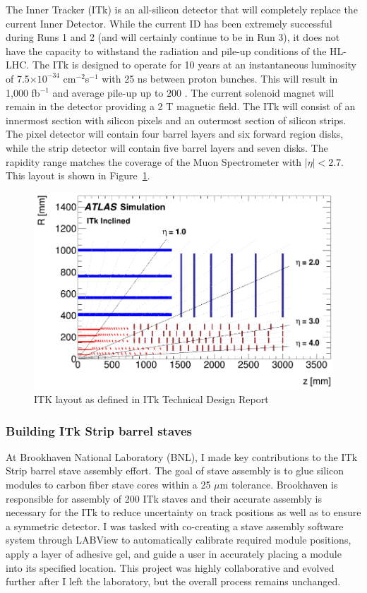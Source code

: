 
The Inner Tracker (ITk) is an all-silicon detector that will completely replace the current Inner Detector.  While the current ID has been extremely successful during Runs 1 and 2 (and will certainly continue to be in Run 3), it does not have the capacity to withstand the radiation and pile-up conditions of the HL-LHC. The ITk is designed to operate for 10 years at an instantaneous luminosity of 7.5$\times10^{-34}$ cm$^{-2}$s$^{-1}$ with 25 ns between proton bunches. This will result in 1,000 fb$^{-1}$ and average pile-up up to $200$ \cite{ITktech}. The current solenoid magnet will remain in the detector providing a 2 T magnetic field. The ITk will consist of an innermost section with silicon pixels and an outermost section of silicon strips. The pixel detector will contain four barrel layers and six forward region disks, while the strip detector will contain five barrel layers and seven disks. The rapidity range matches the coverage of the Muon Spectrometer with $|\eta|<2.7$. This layout is shown in Figure~\ref{fig:ITklayout}. 
\begin{figure}[!h]
        \centering
    \includegraphics[width=.6\textwidth]{Pictures/ITklayout.png}
    \caption{ ITK layout as defined in ITk Technical Design Report \cite{ITktech}}
    \label{fig:ITklayout}
\end{figure}

\subsubsection{Building ITk Strip barrel staves}
At Brookhaven National Laboratory (BNL), I made key contributions to the ITk Strip barrel stave assembly effort. The goal of stave assembly is to glue silicon modules to carbon fiber stave cores within a 25 $\mu$m tolerance. Brookhaven is responsible for assembly of 200 ITk staves and their accurate assembly is necessary for the ITk to reduce uncertainty on track positions as well as to ensure a symmetric detector. I was tasked with co-creating a stave assembly software system through LABView to automatically calibrate required module positions, apply a layer of adhesive gel, and guide a user in accurately placing a module into its specified location. This project was highly collaborative and evolved further after I left the laboratory, but the overall process remains unchanged.

